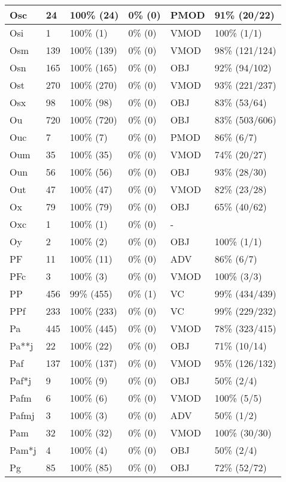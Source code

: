 \begin{figure*}
\begin{tabular}{|l|l|l|l||l|l|}
\hline
 Osc & 24 & 100\% (24) & 0\% (0) & PMOD & 91\% (20/22) \\ 
\hline
 Osi & 1 & 100\% (1) & 0\% (0) & VMOD & 100\% (1/1) \\ 
\hline
 Osm & 139 & 100\% (139) & 0\% (0) & VMOD & 98\% (121/124) \\ 
\hline
 Osn & 165 & 100\% (165) & 0\% (0) & OBJ & 92\% (94/102) \\ 
\hline
 Ost & 270 & 100\% (270) & 0\% (0) & VMOD & 93\% (221/237) \\ 
\hline
 Osx & 98 & 100\% (98) & 0\% (0) & OBJ & 83\% (53/64) \\ 
\hline
 Ou & 720 & 100\% (720) & 0\% (0) & OBJ & 83\% (503/606) \\ 
\hline
 Ouc & 7 & 100\% (7) & 0\% (0) & PMOD & 86\% (6/7) \\ 
\hline
 Oum & 35 & 100\% (35) & 0\% (0) & VMOD & 74\% (20/27) \\ 
\hline
 Oun & 56 & 100\% (56) & 0\% (0) & OBJ & 93\% (28/30) \\ 
\hline
 Out & 47 & 100\% (47) & 0\% (0) & VMOD & 82\% (23/28) \\ 
\hline
 Ox & 79 & 100\% (79) & 0\% (0) & OBJ & 65\% (40/62) \\ 
\hline
 Oxc & 1 & 100\% (1) & 0\% (0) & - &  \\ 
\hline
 Oy & 2 & 100\% (2) & 0\% (0) & OBJ & 100\% (1/1) \\ 
\hline
 PF & 11 & 100\% (11) & 0\% (0) & ADV & 86\% (6/7) \\ 
\hline
 PFc & 3 & 100\% (3) & 0\% (0) & VMOD & 100\% (3/3) \\ 
\hline
 PP & 456 & 99\% (455) & 0\% (1) & VC & 99\% (434/439) \\ 
\hline
 PPf & 233 & 100\% (233) & 0\% (0) & VC & 99\% (229/232) \\ 
\hline
 Pa & 445 & 100\% (445) & 0\% (0) & VMOD & 78\% (323/415) \\ 
\hline
 Pa**j & 22 & 100\% (22) & 0\% (0) & OBJ & 71\% (10/14) \\ 
\hline
 Paf & 137 & 100\% (137) & 0\% (0) & VMOD & 95\% (126/132) \\ 
\hline
 Paf*j & 9 & 100\% (9) & 0\% (0) & OBJ & 50\% (2/4) \\ 
\hline
 Pafm & 6 & 100\% (6) & 0\% (0) & VMOD & 100\% (5/5) \\ 
\hline
 Pafmj & 3 & 100\% (3) & 0\% (0) & ADV & 50\% (1/2) \\ 
\hline
 Pam & 32 & 100\% (32) & 0\% (0) & VMOD & 100\% (30/30) \\ 
\hline
 Pam*j & 4 & 100\% (4) & 0\% (0) & OBJ & 50\% (2/4) \\ 
\hline
 Pg & 85 & 100\% (85) & 0\% (0) & OBJ & 72\% (52/72) \\ 
\hline
\end{tabular}
\end{figure*}
